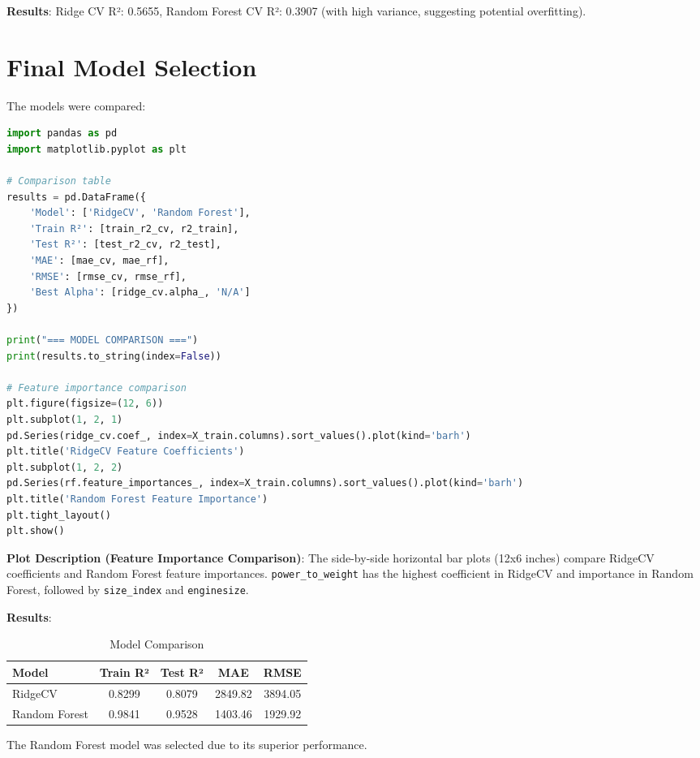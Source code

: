 \documentclass[12pt]{article}
\begin{document}
\textbf{Results}: Ridge CV R²: 0.5655, Random Forest CV R²: 0.3907 (with high variance, suggesting potential overfitting).

\section{Final Model Selection}
The models were compared:

\begin{lstlisting}[language=Python, caption=Model Comparison Code]
import pandas as pd
import matplotlib.pyplot as plt

# Comparison table
results = pd.DataFrame({
    'Model': ['RidgeCV', 'Random Forest'],
    'Train R²': [train_r2_cv, r2_train],
    'Test R²': [test_r2_cv, r2_test],
    'MAE': [mae_cv, mae_rf],
    'RMSE': [rmse_cv, rmse_rf],
    'Best Alpha': [ridge_cv.alpha_, 'N/A']
})

print("=== MODEL COMPARISON ===")
print(results.to_string(index=False))

# Feature importance comparison
plt.figure(figsize=(12, 6))
plt.subplot(1, 2, 1)
pd.Series(ridge_cv.coef_, index=X_train.columns).sort_values().plot(kind='barh')
plt.title('RidgeCV Feature Coefficients')
plt.subplot(1, 2, 2)
pd.Series(rf.feature_importances_, index=X_train.columns).sort_values().plot(kind='barh')
plt.title('Random Forest Feature Importance')
plt.tight_layout()
plt.show()
\end{lstlisting}

\textbf{Plot Description (Feature Importance Comparison)}: The side-by-side horizontal bar plots (12x6 inches) compare RidgeCV coefficients and Random Forest feature importances. \texttt{power\_to\_weight} has the highest coefficient in RidgeCV and importance in Random Forest, followed by \texttt{size\_index} and \texttt{enginesize}.

\textbf{Results}:
\begin{table}[h]
\centering
\caption{Model Comparison}
\begin{tabular}{lcccc}
\toprule
Model & Train R² & Test R² & MAE & RMSE \\
\midrule
RidgeCV & 0.8299 & 0.8079 & 2849.82 & 3894.05 \\
Random Forest & 0.9841 & 0.9528 & 1403.46 & 1929.92 \\
\bottomrule
\end{tabular}
\end{table}

The Random Forest model was selected due to its superior performance.
\end{document}
